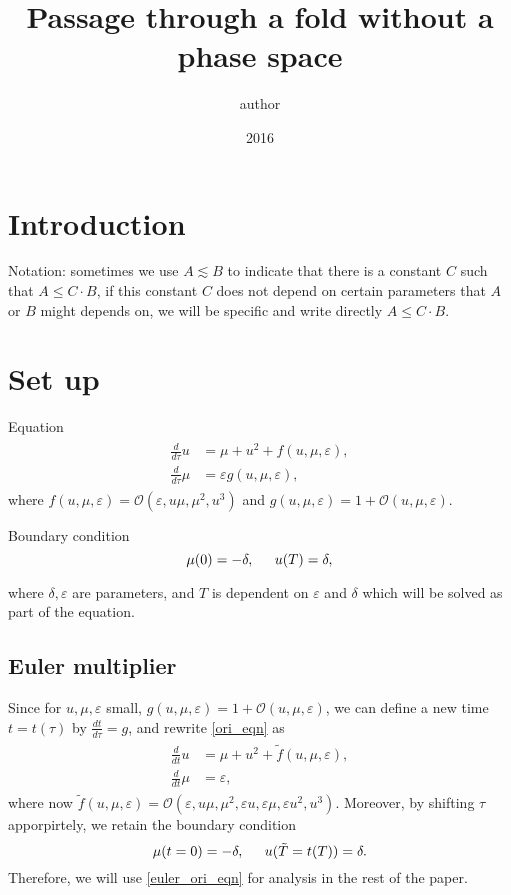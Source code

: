\documentclass[letterpaper,11pt]{article}
\title{Passage through a fold without a phase space}
\author{author}
\date{2016}
\newcommand{\rmO}{\mathcal{O}}
\newcommand{\eps}{\varepsilon}
\newcommand{\lar}{ \lesssim }
\numberwithin{equation}{section}
\theoremstyle{plain}
\begin{document}
\section{Introduction}

Notation: sometimes we use $A \lar B$ to indicate that there is a constant $C$ such that $A \le C \cdot B$, if this constant $C$ does not depend on certain parameters that $A$ or $B$ might depends on, we will be specific and write directly $A \le C\cdot B$.


\section{Set up}


Equation
\begin{align}\label{ori_eqn}
\begin{split}
\frac{d}{d\tau}u &= \mu+u^2+ f(u,\mu,\eps),\\
\frac{d}{d\tau}\mu &=  \eps g(u,\mu,\eps),
\end{split}
\end{align}
where $f(u,\mu,\eps) = \rmO(\eps, u\mu,\mu^2,u^3)$ and $g(u,\mu,\eps) = 1+\rmO(u,\mu,\eps)$. 

Boundary condition
\begin{equation}
\mu(0) = -\delta, \hspace{0.2in} u(T) = \delta,
\end{equation}

where $\delta,\eps$ are parameters,  and $T$ is dependent on $\eps$ and $\delta$ which will be solved as part of the equation.

\subsection{Euler multiplier}
Since for $u,\mu,\eps$ small, $g(u,\mu,\eps) = 1 + \rmO(u,\mu,\eps)$, we can define a new time $t = t(\tau)$ by $\frac{dt}{d\tau} = g$, and rewrite \eqref{ori_eqn}  as
\begin{align}\label{euler_ori_eqn}
\begin{split}
\frac{d}{dt}u &= \mu+u^2+ \tilde{f}(u,\mu,\eps),\\
\frac{d}{dt}\mu &=  \eps ,
\end{split}
\end{align}
where now $\tilde{f}(u,\mu,\eps) = \rmO(\eps,  u\mu, \mu^2,\eps u, \eps \mu, \eps u^2, u^3)$. Moreover, by shifting $\tau$ apporpirtely, we retain the boundary condition
\[
\mu(t=0) = -\delta, \hspace{0.2in} u(\tilde{T}=t(T)) = \delta.
\]
Therefore, we will use \eqref{euler_ori_eqn} for analysis in the rest of the paper.
\end{document}
